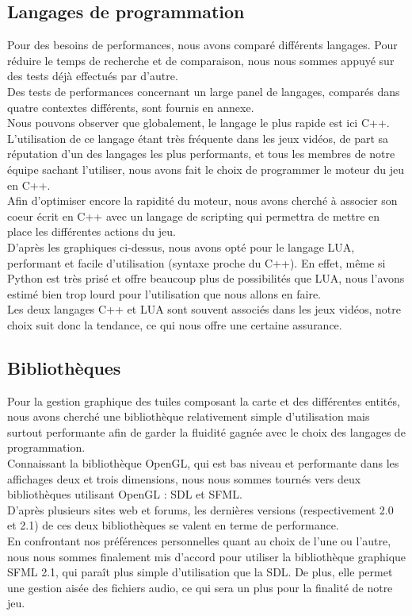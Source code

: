 \documentclass[a4paper]{article}
\newcommand{\alinea}{\hspace*{0.5cm}}
\begin{document}
      \subsection{Langages de programmation}
        \alinea Pour des besoins de performances, nous avons comparé différents langages. Pour réduire le temps de recherche et de comparaison, nous nous sommes appuyé sur des tests déjà effectués par d'autre.\\
        \alinea Des tests de performances concernant un large panel de langages, comparés dans quatre contextes différents, sont fournis en annexe.\\
        \alinea Nous pouvons observer que globalement, le langage le plus rapide est ici C++. L'utilisation de ce langage étant très fréquente dans les jeux vidéos, de part sa réputation d'un des langages les plus performants, et tous les membres de notre équipe sachant l'utiliser, nous avons fait le choix de programmer le moteur du jeu en C++.\\
        \alinea Afin d'optimiser encore la rapidité du moteur, nous avons cherché à associer son coeur écrit en C++ avec un langage de scripting qui permettra de mettre en place les différentes actions du jeu.\\ D'après les graphiques ci-dessus, nous avons opté pour le langage LUA, performant et facile d'utilisation (syntaxe proche du C++). En effet, même si Python est très prisé et offre beaucoup plus de possibilités que LUA, nous l'avons estimé bien trop lourd pour l'utilisation que nous allons en faire.\\
        \alinea Les deux langages C++ et LUA sont souvent associés dans les jeux vidéos, notre choix suit donc la tendance, ce qui nous offre une certaine assurance.

      \subsection{Bibliothèques}
        \alinea Pour la gestion graphique des tuiles composant la carte et des différentes entités, nous avons cherché une bibliothèque relativement simple d'utilisation mais surtout performante afin de garder la fluidité gagnée avec le choix des langages de programmation.\\
        \alinea Connaissant la bibliothèque OpenGL, qui est bas niveau et performante dans les affichages deux et trois dimensions, nous nous sommes tournés vers deux bibliothèques utilisant OpenGL : SDL et SFML.\\
        \alinea D'après plusieurs sites web et forums, les dernières versions (respectivement 2.0 et 2.1) de ces deux bibliothèques se valent en terme de performance.\\
        \alinea En confrontant nos préférences personnelles quant au choix de l'une ou l'autre, nous nous sommes finalement mis d'accord pour utiliser la bibliothèque graphique SFML 2.1, qui paraît plus simple d'utilisation que la SDL. De plus, elle permet une gestion aisée des fichiers audio, ce qui sera un plus pour la finalité de notre jeu.
      
\end{document}
